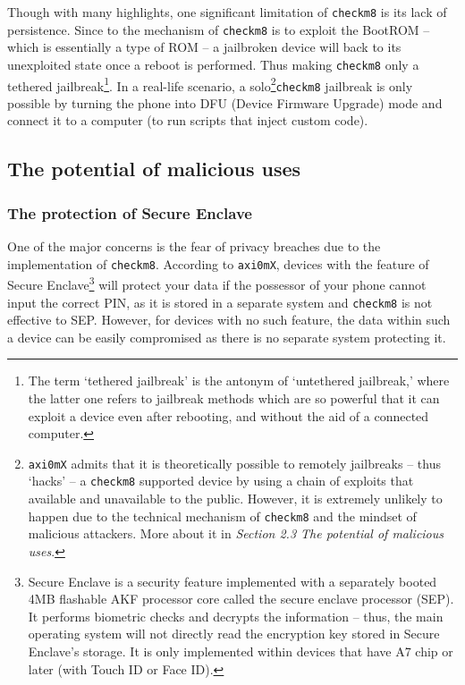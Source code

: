 \documentclass[10pt]{article}
\newcommand{\inlinecode}{\texttt}
\begin{document}
Though with many highlights, one significant limitation of \inlinecode{checkm8} is its lack of persistence. Since to the mechanism of \inlinecode{checkm8} is to exploit the BootROM -- which is essentially a type of ROM -- a jailbroken device will back to its unexploited state once a reboot is performed. Thus making \inlinecode{checkm8} only a tethered jailbreak\footnote{The term `tethered jailbreak' is the antonym of `untethered jailbreak,' where the latter one refers to jailbreak methods which are so powerful that it can exploit a device even after rebooting, and without the aid of a connected computer.}. In a real-life scenario, a solo\footnote{\inlinecode{axi0mX} admits that it is theoretically possible to remotely jailbreaks -- thus `hacks' -- a \inlinecode{checkm8} supported device by using a chain of exploits that available and unavailable to the public. However, it is extremely unlikely to happen due to the technical mechanism of \inlinecode{checkm8} and the mindset of malicious attackers. More about it in \textit{Section 2.3 The potential of malicious uses}.}\inlinecode{checkm8} jailbreak is only possible by turning the phone into DFU (Device Firmware Upgrade) mode and connect it to a computer (to run scripts that inject custom code).

\subsection{The potential of malicious uses}
\subsubsection{The protection of Secure Enclave}
One of the major concerns is the fear of privacy breaches due to the implementation of \inlinecode{checkm8}. According to \inlinecode{axi0mX}, devices with the feature of Secure Enclave\footnote{Secure Enclave is a security feature implemented with a separately booted 4MB flashable AKF processor core called the secure enclave processor (SEP). It performs biometric checks and decrypts the information -- thus, the main operating system will not directly read the encryption key stored in Secure Enclave's storage. It is only implemented within devices that have A7 chip or later (with Touch ID or Face ID).} will protect your data if the possessor of your phone cannot input the correct PIN, as it is stored in a separate system and \inlinecode{checkm8} is not effective to SEP. However, for devices with no such feature, the data within such a device can be easily compromised as there is no separate system protecting it.
\end{document}
